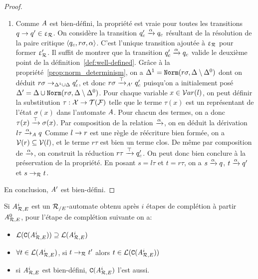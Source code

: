 \begin{proof}
\begin{enumerate}
\item \label{two}
  Comme $\mathit A$ est bien-défini, la propriété est vraie pour toutes les transitions $q \rightarrow q'\in \upvarepsilon_{\mathcal R}$.
  On considère la transition $q'_c \xrightarrow{\alpha} q_c$ résultant de la résolution de la paire critique $\langle q_c ,r\sigma,\alpha\rangle$. 
  C'est l'unique transition ajoutée à $\upvarepsilon_{\mathcal R}$ pour former $\upvarepsilon_{\mathcal R}'$. Il suffit de montrer que la transition $q'_c \xrightarrow{\alpha} q_c$
  valide le deuxième point de la définition~\ref{def:well-defined}.
  Grâce à la propriété~\ref{prop:norm_determinism}, on a $\Delta^1 = \mathtt{Norm}(r\sigma,\Delta\setminus\Delta^0)$ dont on
  déduit $r\sigma \rightarrow_{\Delta^1\cup\Delta} q'_c$, et donc $r\sigma \xrightarrow{\top}_{\mathit A'} q'_c$ puisqu'on a initialement posé 
  $\Delta' = \Delta \cup \mathtt{Norm}(r\sigma,\Delta\setminus\Delta^0)$.
  Pour chaque variable $x\in\mathcal{ V}ar(l)$, on peut définir la substitution $\tau:\mathcal X \rightarrow \mathcal{T(F)}$ 
  telle que le terme $\tau(x)$ est un représentant de l'état $\sigma(x)$ dans l'automate $\mathit A$.
  Pour chacun des termes, on a donc $\tau(x) \xrightarrow{\top} \sigma(x)$.
  Par composition de la relation $\xrightarrow{\alpha}$, on en déduit la dérivation $l\tau\xrightarrow{\alpha}_\mathit A q$
  Comme $l\rightarrow r$ est une règle de réécriture bien formée, on a $\mathcal V(r) \subseteq \mathcal V(l)$,
  et le terme $r\tau$ est bien un terme clos. De même par composition de $\xrightarrow{\alpha}$, 
  on construit la réduction $r\tau \xrightarrow{\top} q'_c$. On peut donc bien conclure à la préservation de la propriété.
  En posant $s=l\tau$ et $t=r\tau$, on a $s\xrightarrow{\alpha}q $, $t\xrightarrow{\alpha}q' $ et $s\rightarrow_\mathcal R t $.
\end{enumerate}
En conclusion, $\mathit A'$ est bien-défini.
\end{proof}

\begin{theorem}
  \label{thm:C}
  Si ${\mathit A}_{\mathcal R,E}^i$ est un ${\mathcal R_{/E}}$-automate obtenu après $i$ étapes de complétion à partir ${\mathit A}_{\mathcal R,E}^0$,
  pour l'étape de complétion suivante on a:
  \begin{itemize}
  \item $\mathcal{L}(\mathtt{C}({\mathit A}_{\mathcal R,E}^i)) \supseteq \mathcal{L}({\mathit A}_{\mathcal R,E}^i)$
  \item $\forall t \in \mathcal{L}({\mathit A}_{\mathcal R,E}^i)$, si $t \rightarrow_\mathcal R t'$ alors $t \in \mathcal{L}(\mathtt{C}({\mathit A}_{\mathcal R,E}^i))$
  \item si ${\mathit A}_{\mathcal R,E}^i$ est bien-défini, $\mathtt{C}({\mathit A}_{\mathcal R,E}^i)$ l'est aussi.
  \end{itemize}
\end{theorem}

